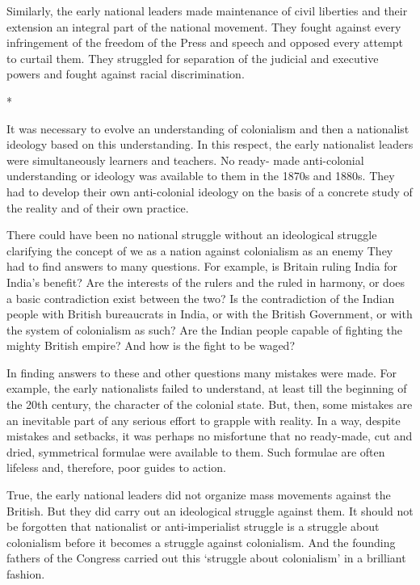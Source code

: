 Similarly, the early national leaders made maintenance of civil liberties and their extension an integral part of the national movement. They fought against every infringement of the freedom of the Press and speech and opposed every attempt to curtail them. They struggled for separation of the judicial and executive powers and fought against racial discrimination.

\begin{center}*\end{center}



It was necessary to evolve an understanding of colonialism and then a nationalist ideology based on this understanding. In this respect, the early nationalist leaders were simultaneously learners and teachers. No ready- made anti-colonial understanding or ideology was available to them in the 1870s and 1880s. They had to develop their own anti-colonial ideology on the basis of a concrete study of the reality and of their own practice.

There could have been no national struggle without an ideological struggle clarifying the concept of we as a nation against colonialism as an enemy They had to find answers to many questions. For example, is Britain ruling India for India’s benefit? Are the interests of the rulers and the ruled in harmony, or does a basic contradiction exist between the two? Is the contradiction of the Indian people with British bureaucrats in India, or with the British Government, or with the system of colonialism as such? Are the Indian people capable of fighting the mighty British empire? And how is the fight to be waged?

In finding answers to these and other questions many mistakes were made. For example, the early nationalists failed to understand, at least till the beginning of the 20th century, the character of the colonial state. But, then, some mistakes are an inevitable part of any serious effort to grapple with reality. In a way, despite mistakes and setbacks, it was perhaps no misfortune that no ready-made, cut and dried, symmetrical formulae were available to them. Such formulae are often lifeless and, therefore, poor guides to action.

True, the early national leaders did not organize mass movements against the British. But they did carry out an ideological struggle against them. It should not be forgotten that nationalist or anti-imperialist struggle is a struggle about colonialism before it becomes a struggle against colonialism. And the founding fathers of the Congress carried out this ‘struggle about colonialism’ in a brilliant fashion.

